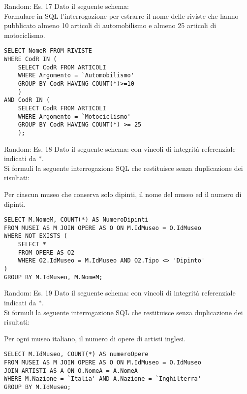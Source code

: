 %
\begin{frame}[fragile]{Random: Es. 17}
\vspace{-.5cm}
Dato il seguente schema:
\schemaRivisteArticoli
\\Formulare in SQL l'interrogazione per estrarre il nome delle riviste che hanno pubblicato almeno 10 articoli di automobilismo e almeno 25 articoli di motociclismo.
\pause

\begin{lstlisting}   
SELECT NomeR FROM RIVISTE
WHERE CodR IN (
    SELECT CodR FROM ARTICOLI
    WHERE Argomento = `Automobilismo'
    GROUP BY CodR HAVING COUNT(*)>=10
    ) 
AND CodR IN (
    SELECT CodR FROM ARTICOLI
    WHERE Argomento = `Motociclismo'
    GROUP BY CodR HAVING COUNT(*) >= 25
    );
\end{lstlisting}
\end{frame}
%
\begin{frame}[fragile]{Random: Es. 18}
\vspace{-.5cm}
Dato il seguente schema:
\schemaMuseiOpereArtisti
con vincoli di integrit\`a referenziale indicati da $*$.
\newline
\\Si formuli la seguente interrogazione SQL che restituisce senza duplicazione dei risultati:

Per ciascun museo che conserva solo dipinti, il nome del museo ed il numero di dipinti.
\pause

\begin{lstlisting}   
SELECT M.NomeM, COUNT(*) AS NumeroDipinti
FROM MUSEI AS M JOIN OPERE AS O ON M.IdMuseo = O.IdMuseo
WHERE NOT EXISTS (
    SELECT *
    FROM OPERE AS O2
    WHERE O2.IdMuseo = M.IdMuseo AND O2.Tipo <> 'Dipinto'
)
GROUP BY M.IdMuseo, M.NomeM;
\end{lstlisting}
\end{frame}
%
\begin{frame}[fragile]{Random: Es. 19}
\vspace{-.5cm}
Dato il seguente schema:
\schemaMuseiOpereArtisti
con vincoli di integrit\`a referenziale indicati da $*$.
\newline
\\Si formuli la seguente interrogazione SQL che restituisce senza duplicazione dei risultati:

Per ogni museo italiano, il numero di opere di artisti inglesi.
\pause

\begin{lstlisting}   
SELECT M.IdMuseo, COUNT(*) AS numeroOpere
FROM MUSEI AS M JOIN OPERE AS O ON M.IdMuseo = O.IdMuseo
JOIN ARTISTI AS A ON O.NomeA = A.NomeA
WHERE M.Nazione = `Italia' AND A.Nazione = `Inghilterra'
GROUP BY M.IdMuseo;
\end{lstlisting}
\end{frame}
